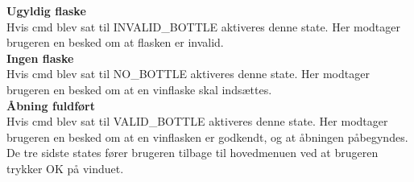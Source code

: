 \textbf{Ugyldig flaske}\\
Hvis cmd blev sat til INVALID\_BOTTLE aktiveres denne state. Her modtager brugeren en besked om at flasken er invalid.\\

\textbf{Ingen flaske}\\
Hvis cmd blev sat til NO\_BOTTLE aktiveres denne state. Her modtager brugeren en besked om at en vinflaske skal indsættes.
\\

\textbf{Åbning fuldført}\\
Hvis cmd blev sat til VALID\_BOTTLE aktiveres denne state. Her modtager brugeren en besked om at en vinflasken er godkendt, og at åbningen påbegyndes.\\


De tre sidste states fører brugeren tilbage til hovedmenuen ved at brugeren trykker OK på vinduet.

